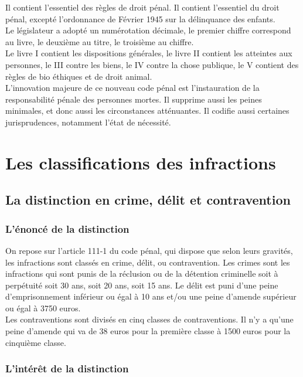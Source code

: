 \documentclass[10pt, a4paper, openany]{book}
\begin{document}
Il contient l'essentiel des règles de droit pénal. Il contient l'essentiel du droit pénal, excepté l'ordonnance de Février 1945 sur la délinquance des enfants. \\
Le législateur a adopté un numérotation décimale, le premier chiffre correspond au livre, le deuxième au titre, le troisième au chiffre. \\
Le livre I contient les dispositions générales, le livre II contient les atteintes aux personnes, le III contre les biens, le IV contre la chose publique, le V contient des règles de bio éthiques et de droit animal. \\
L'innovation majeure de ce nouveau code pénal est l'instauration de la responsabilité pénale des personnes mortes. Il supprime aussi les peines minimales, et donc aussi les circonstances atténuantes. Il codifie aussi certaines jurisprudences, notamment l'état de nécessité. 

\section{Les classifications des infractions}

\subsection{La distinction en crime, délit et contravention}

\subsubsection{L'énoncé de la distinction}

On repose sur l'article 111-1 du code pénal, qui dispose que selon leurs gravités, les infractions sont classés en crime, délit, ou contravention. Les crimes sont les infractions qui sont punis de la réclusion ou de la détention criminelle soit à perpétuité soit 30 ans, soit 20 ans, soit 15 ans. Le délit est puni d'une peine d'emprisonnement inférieur ou égal à 10 ans et/ou une peine d'amende supérieur ou égal à 3750 euros. \\
Les contraventions sont divisés en cinq classes de contraventions. Il n'y a qu'une peine d'amende qui va de 38 euros pour la première classe à 1500 euros pour la cinquième classe.

\subsubsection{L'intérêt de la distinction}
\end{document}
